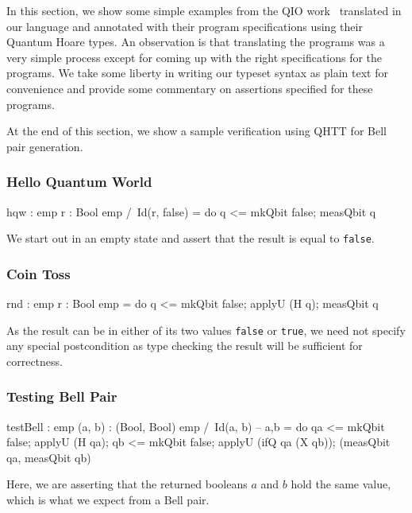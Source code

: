 \documentclass[acmsmall,nonacm,timestamp]{acmart}
\begin{document}
In this section, we show some simple examples from the QIO work~\cite{qio} translated in our language and annotated with their program specifications using their Quantum Hoare types. An observation is that translating the programs was a very simple process except for coming up with the right specifications for the programs. We take some liberty in writing our typeset syntax as plain text for convenience and provide some commentary on assertions specified for these programs.

At the end of this section, we show a sample verification using QHTT for Bell pair generation.

\subsubsection*{Hello Quantum World}
\begin{QCode}
hqw : {emp} r : Bool {emp /\ Id(r, false)}
    = do q <= mkQbit false;
         measQbit q
\end{QCode}

We start out in an empty state and assert that the result is equal to \texttt{false}.

\subsubsection*{Coin Toss}
\begin{QCode}
rnd : {emp} r : Bool {emp}
    = do q <= mkQbit false;
         applyU (H q);
         measQbit q
\end{QCode}

As the result can be in either of its two values \texttt{false} or \texttt{true}, we need not specify any special postcondition as type checking the result will be sufficient for correctness.

\subsubsection*{Testing Bell Pair}
\begin{QCode}
testBell : {emp} (a, b) : (Bool, Bool) {emp /\ Id(a, b)}  -- a,b 
         = do qa <= mkQbit false;
              applyU (H qa);
              qb <= mkQbit false;
              applyU (ifQ qa (X qb));
              (measQbit qa, measQbit qb)
\end{QCode}

Here, we are asserting that the returned booleans $a$ and $b$ hold the same value, which is what we expect from a Bell pair.
\end{document}
